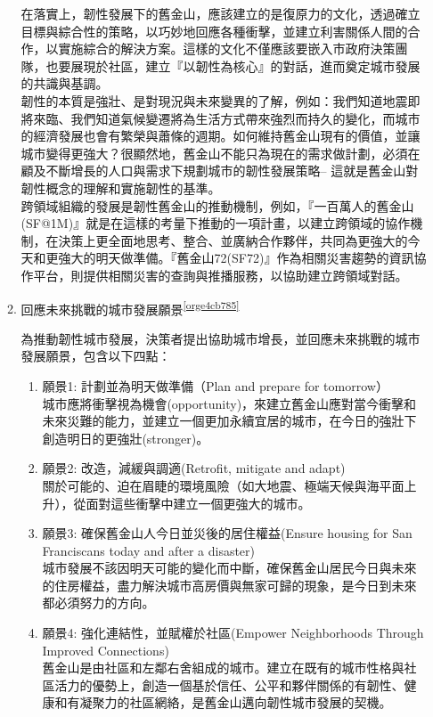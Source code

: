 \documentclass[a4paper,12pt]{article}
\begin{document}
\begin{enumerate}
\begin{enumerate}
在落實上，韌性發展下的舊金山，應該建立的是復原力的文化，透過確立目標與綜合性的策略，以巧妙地回應各種衝擊，並建立利害關係人間的合作，以實施綜合的解決方案。這樣的文化不僅應該要嵌入市政府決策團隊，也要展現於社區，建立『以韌性為核心』的對話，進而奠定城市發展的共識與基調。\\

韌性的本質是強壯、是對現況與未來變異的了解，例如：我們知道地震即將來臨、我們知道氣候變遷將為生活方式帶來強烈而持久的變化，而城市的經濟發展也會有繁榮與蕭條的週期。如何維持舊金山現有的價值，並讓城市變得更強大？很顯然地，舊金山不能只為現在的需求做計劃，必須在顧及不斷增長的人口與需求下規劃城市的韌性發展策略– 這就是舊金山對韌性概念的理解和實施韌性的基準。\\

跨領域組織的發展是韌性舊金山的推動機制，例如，『一百萬人的舊金山(SF@1M)』就是在這樣的考量下推動的一項計畫，以建立跨領域的協作機制，在決策上更全面地思考、整合、並廣納合作夥伴，共同為更強大的今天和更強大的明天做準備。『舊金山72(SF72)』作為相關災害趨勢的資訊協作平台，則提供相關災害的查詢與推播服務，以協助建立跨領域對話。\\

\item 回應未來挑戰的城市發展願景\textsuperscript{\ref{orge4cb785}}
\label{sec:org1b9670b}

為推動韌性城市發展，決策者提出協助城市增長，並回應未來挑戰的城市發展願景，包含以下四點：\\
\begin{enumerate}
\item 願景1: 計劃並為明天做準備（Plan and prepare for tomorrow）\\
城市應將衝擊視為機會(opportunity)，來建立舊金山應對當今衝擊和未來災難的能力，並建立一個更加永續宜居的城市，在今日的強壯下創造明日的更強壯(stronger)。\\
\item 願景2: 改造，減緩與調適(Retrofit, mitigate and adapt)\\
關於可能的、迫在眉睫的環境風險（如大地震、極端天候與海平面上升），從面對這些衝擊中建立一個更強大的城市。\\
\item 願景3: 確保舊金山人今日並災後的居住權益(Ensure housing for San Franciscans today and after a disaster)\\
城市發展不該因明天可能的變化而中斷，確保舊金山居民今日與未來的住房權益，盡力解決城市高房價與無家可歸的現象，是今日到未來都必須努力的方向。\\
\item 願景4: 強化連結性，並賦權於社區(Empower Neighborhoods Through Improved Connections)\\
舊金山是由社區和左鄰右舍組成的城市。建立在既有的城市性格與社區活力的優勢上，創造一個基於信任、公平和夥伴關係的有韌性、健康和有凝聚力的社區網絡，是舊金山邁向韌性城市發展的契機。\\
\end{enumerate}


\end{enumerate}
\end{enumerate}
\end{document}
